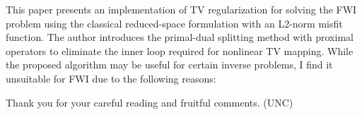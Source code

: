 \begin{pointGen}
	This paper presents an implementation of TV regularization for solving the FWI problem using the classical reduced-space formulation with an L2-norm misfit function. The author introduces the primal-dual splitting method with proximal operators to eliminate the inner loop required for nonlinear TV mapping. While the proposed algorithm may be useful for certain inverse problems, I find it unsuitable for FWI due to the following reasons:
\end{pointGen}

\begin{reply}
	Thank you for your careful reading and fruitful comments. (UNC)
\end{reply}